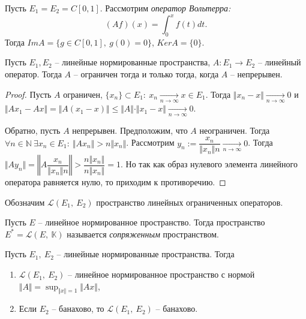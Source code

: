 \begin{example}
Пусть $\displaystyle E_{1} =E_{2} =C[ 0,1]$. Рассмотрим \textit{оператор Вольтерра}\textit{:}
\begin{equation*}
( Af)( x) =\int _{0}^{x} f( t) dt.
\end{equation*}
Тогда $\displaystyle ImA=\{g\in C[ 0,1] ,\ g( 0) =0\}$, $\displaystyle KerA=\{0\}$.
\end{example}
\begin{theorem}
Пусть $\displaystyle E_{1} ,E_{2}$ -- линейные нормированные пространства, $\displaystyle A:E_{1}\rightarrow E_{2}$ -- линейный оператор. Тогда $\displaystyle A$ -- ограничен тогда и только тогда, когда $\displaystyle A$ -- непрерывен.
\end{theorem}
\begin{proof}
Пусть $\displaystyle A$ ограничен, $\displaystyle \{x_{n}\} \subset E_{1} :\ x_{n}\xrightarrow[n\rightarrow \infty ]{} x\in E_{1}$. Тогда $\displaystyle \Vert x_{n} -x\Vert \xrightarrow[n\rightarrow \infty ]{} 0$ и $\displaystyle \Vert Ax_{1} -Ax\Vert =\Vert A( x_{1} -x)\Vert \leqslant \Vert A\Vert \cdotp \Vert x_{1} -x\Vert \xrightarrow[n\rightarrow \infty ]{} 0$.

Обратно, пусть $\displaystyle A$ непрерывен. Предположим, что $\displaystyle A$ неограничен. Тогда $\displaystyle \forall n\in \mathbb{N} \ \exists x_{n} \in E_{1} :\ \Vert Ax_{n}\Vert  >n\Vert x_{n}\Vert $. Рассмотрим $\displaystyle y_{n} :=\dfrac{x_{n}}{\Vert x_{n}\Vert n}\xrightarrow[n\rightarrow \infty ]{} 0$. Тогда $\displaystyle \Vert Ay_{n}\Vert =\left\Vert A\dfrac{x_{n}}{\Vert x_{n}\Vert n}\right\Vert  >\dfrac{n\Vert x_{n}\Vert }{n\Vert x_{n}\Vert } =1$. Но так как образ нулевого элемента линейного оператора равняется нулю, то приходим к противоречию.
\end{proof}
\begin{definition}
Обозначим $\displaystyle \mathcal{L}( E_{1} ,\ E_{2})$ пространство линейных ограниченных операторов.
\end{definition}
\begin{definition}
Пусть $\displaystyle E$ -- линейное нормированное пространство. Тогда пространство $\displaystyle E^{*} =\mathcal{L}( E,\ \mathbb{K})$  называется \textit{сопряженным} пространством.
\end{definition}
\begin{theorem}
Пусть $\displaystyle E_{1} ,\ E_{2}$ -- линейные нормированные пространства. Тогда
\begin{enumerate}
    \item $\displaystyle \mathcal{L}( E_{1} ,\ E_{2})$ -- линейное нормированное пространство с нормой $\displaystyle \Vert A\Vert =\sup _{\Vert x\Vert =1}\Vert Ax\Vert $,
    \item Если $\displaystyle E_{2}$ -- банахово, то $\displaystyle \mathcal{L}( E_{1} ,\ E_{2})$ -- банахово.
\end{enumerate}
\end{theorem}
